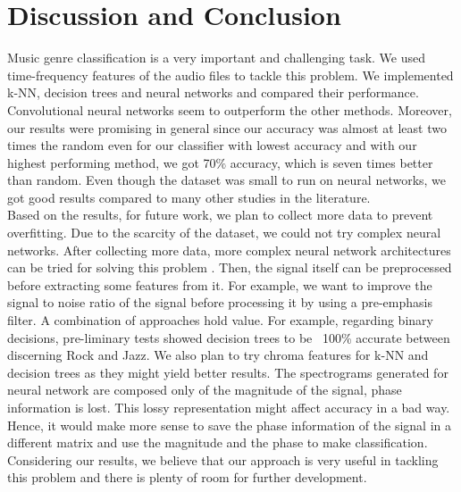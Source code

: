 \documentclass[acmtog, authorversion]{acmart}
\begin{document}
\section{Discussion and Conclusion}
Music genre classification is a very important and challenging task. We used time-frequency features of the audio files to tackle this problem. We implemented
k-NN, decision trees and neural networks and compared their performance. Convolutional neural networks seem to outperform the other methods.
 Moreover, our results were promising in general since our accuracy was almost at least two times the random even for our classifier with lowest accuracy and with our highest performing method, we got 70$\%$ accuracy, which is seven
times better than random. Even though the dataset was small to run on neural networks, we got good results compared to many other studies in the literature. \cite{mckay2004issues} \\
Based on the results, for future work, we plan to collect more data to prevent overfitting. Due to the scarcity of the dataset, we could not try complex
neural networks. After collecting more data, more complex neural network architectures can be tried for solving this problem . Then, the signal itself can be
preprocessed before extracting some features from it. For example, we want to improve the signal to noise ratio of the signal before processing it by using a pre-emphasis filter. A combination of approaches hold value. For example, regarding binary decisions, pre-liminary tests showed decision trees to be ~100\% accurate between discerning Rock and Jazz. 
We also plan to try chroma features
for k-NN and decision trees as they might yield better results. The spectrograms generated for neural network are composed only of the magnitude of the signal, 
phase information is lost. This lossy representation might affect accuracy in a bad way. Hence, it would make more sense to save the phase information of the signal
in a different matrix and use the magnitude and the phase to make classification. Considering our results, we believe that our approach is very 
useful in tackling this problem and there is plenty of room for further development. 



\end{document}
